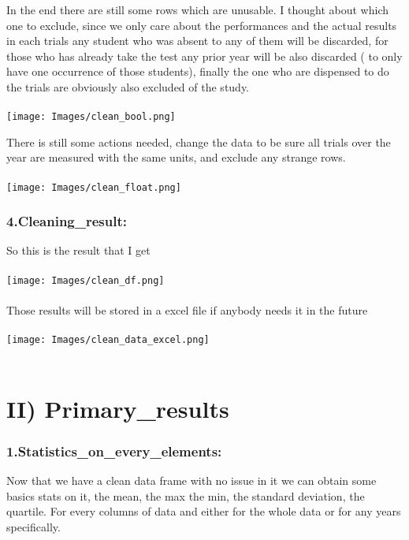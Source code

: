 \documentclass[
	12pt, %
]{fphw_assignment_toc}
\begin{document}
In the end there are still some rows which are unusable. I thought about which one to exclude, since we only care about the performances and the actual results in each trials any student who was absent to any of them will be discarded, for those who has already take the test any prior year will be also discarded ( to only have one occurrence of those students), finally the one who are dispensed to do the trials are obviously also excluded of the study.
\\
\bigskip
\\
\texttt{[image: Images/clean\_bool.png]}

There is still some actions needed, change the data to be sure all trials over the year are measured with the same units, and exclude any strange rows.
\\
\bigskip
\\
\texttt{[image: Images/clean\_float.png]}


\newpage

\subsubsection{\large\bf 4.Cleaning_result:}

So this is the result that I get 
\\
\bigskip
\\
\texttt{[image: Images/clean\_df.png]}
\\
\bigskip
\\
Those results will be stored in a excel file if anybody needs it in the future
\\
\bigskip
\\
\texttt{[image: Images/clean\_data\_excel.png]}
\\
\bigskip
\\
\newpage
\section{\large\bf II) Primary_results~}
\subsubsection{\large\bf 1.Statistics_on_every_elements: }

Now that we have a clean data frame with no issue in it we can obtain some basics stats on it, the mean, the max the min, the standard deviation, the quartile. For every columns of data and either for the whole data or for any years specifically. 
\end{document}
